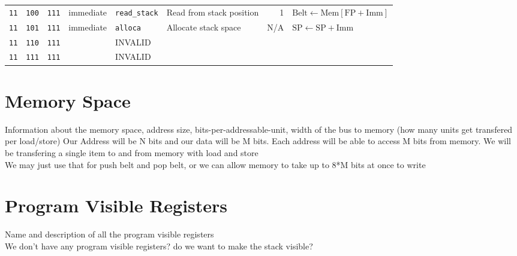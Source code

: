 \documentclass{article}
\begin{document}
\begin{landscape}
\begin{longtable}{c c c c l l r l}
		\texttt{11} & \texttt{100} & \texttt{111} & immediate & \texttt{read\_stack} & Read from stack position & 1   & \(
			\textrm{Belt} \gets \textrm{Mem}\left[\textrm{FP} + \textrm{Imm}\right]\) \\
		\texttt{11} & \texttt{101} & \texttt{111} & immediate & \texttt{alloca}      & Allocate stack space     & N/A & \(
			\textrm{SP} \gets \textrm{SP} + \textrm{Imm}\) \\
		\texttt{11} & \texttt{110} & \texttt{111} & & INVALID & \\
		\texttt{11} & \texttt{111} & \texttt{111} & & INVALID & \\
	\end{longtable}
\end{landscape}

\section{Memory Space}
	Information about the memory space, address size, bits-per-addressable-unit, width of the bus to memory (how many units get transfered per load/store)
	Our Address will be N bits and our data will be M bits.
	Each address will be able to access M bits from memory.
	We will be transfering a single item to and from memory with load and store\\
	We may just use that for push belt and pop belt, or we can allow memory to take up to 8*M bits at once to write

\section{Program Visible Registers}
	Name and description of all the program visible registers\\
	We don't have any program visible registers? do we want to make the stack visible? 
\end{document}
